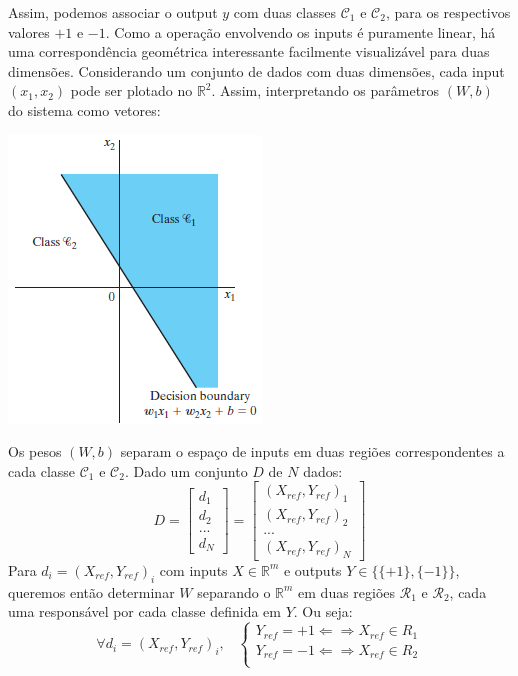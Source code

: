 \documentclass[
	12pt,				%
	oneside,			%
	a4paper,			%
	english,			%
	french,				%
	spanish,			%
	brazil,				%
	]{abntex2}
\begin{document}
Assim, podemos associar o output $y$ com duas classes $\mathcal{C}_1$ e $\mathcal{C}_2$, para os respectivos valores $+1$ e $-1$. Como a opera\c{c}\~ao envolvendo os inputs \'e puramente linear, h\'a uma correspond\^encia geom\'etrica interessante facilmente visualiz\'avel para duas dimens\~oes. Considerando um conjunto de dados com duas dimens\~oes, cada input $(x_1,x_2)$ pode ser plotado no $\mathbb{R}^2$. Assim, interpretando os par\^ametros $(W,b)$ do sistema como vetores:

\begin{center}
	\includegraphics[scale=1]{perceptron2d.png}
\end{center} 

Os pesos $(W,b)$ separam o espa\c{c}o de inputs em duas regi\~oes correspondentes a cada classe $\mathcal{C}_1$ e $\mathcal{C}_2$. Dado um conjunto $D$ de $N$ dados:
$$D = \begin{bmatrix}
d_1 \\
d_2 \\
... \\
d_N
\end{bmatrix} =
\begin{bmatrix}
(X_{ref},Y_{ref})_1 \\
(X_{ref},Y_{ref})_2 \\
... \\
(X_{ref},Y_{ref})_N
\end{bmatrix}$$
Para $d_i = (X_{ref},Y_{ref})_i$ com inputs $X \in \mathbb{R}^m$ e outputs $Y \in \{\{+1\},\{-1\}\}$, queremos então determinar $W$ separando o $\mathbb{R}^m$ em duas regiões $\mathcal{R}_1$ e $\mathcal{R}_2$, cada uma responsável por cada classe definida em $Y$. Ou seja:
$$\forall d_i = (X_{ref},Y_{ref})_i \text{,}  \enspace \enspace \begin{cases}
Y_{ref} = +1 \Leftarrow \Rightarrow X_{ref} \in R_1 \\
Y_{ref} = -1 \Leftarrow \Rightarrow X_{ref} \in R_2 \\
\end{cases} $$
\end{document}
